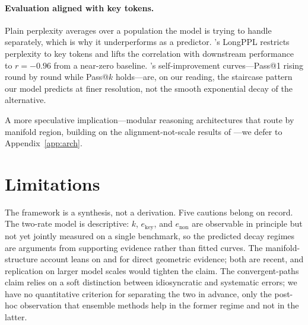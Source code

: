 \paragraph{Evaluation aligned with key tokens.}
Plain perplexity averages over a population the model is trying to handle separately, which is why it underperforms as a predictor. \citet{fang2024what}'s LongPPL restricts perplexity to key tokens and lifts the correlation with downstream performance to $r = -0.96$ from a near-zero baseline. \citet{costello2025think}'s self-improvement curves---Pass@1 rising round by round while Pass@$k$ holds---are, on our reading, the staircase pattern our model predicts at finer resolution, not the smooth exponential decay of the alternative.

A more speculative implication---modular reasoning architectures that route by manifold region, building on the alignment-not-scale results of \citet{costello2025think}---we defer to Appendix~\ref{app:arch}.

\section{Limitations}
\label{sec:limitations}

The framework is a synthesis, not a derivation. Five cautions belong on record. The two-rate model is descriptive: $k$, $e_{\text{key}}$, and $e_{\text{non}}$ are observable in principle but not yet jointly measured on a single benchmark, so the predicted decay regimes are arguments from supporting evidence rather than fitted curves. The manifold-structure account leans on \citet{li2025unraveling} and \citet{robinson2025token} for direct geometric evidence; both are recent, and replication on larger model scales would tighten the claim. The convergent-paths claim relies on a soft distinction between idiosyncratic and systematic errors; we have no quantitative criterion for separating the two in advance, only the post-hoc observation that ensemble methods help in the former regime and not in the latter.

